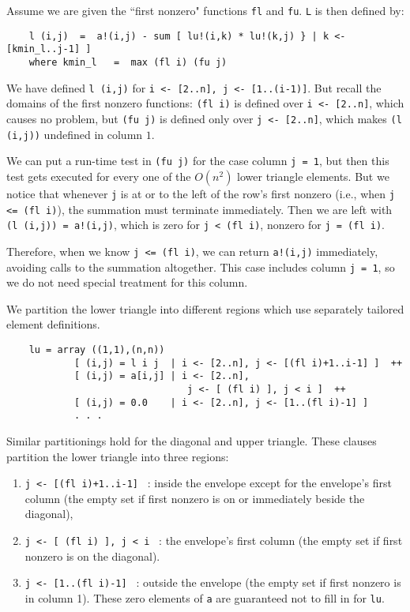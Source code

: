 Assume we are given the ``first nonzero"
functions {\tt fl} and {\tt fu}.  {\tt L} is then defined by:
\begin{verbatim}
    l (i,j)  =  a!(i,j) - sum [ lu!(i,k) * lu!(k,j) } | k <- [kmin_l..j-1] ]
    where kmin_l   =  max (fl i) (fu j)
\end{verbatim}

We have defined {\tt l (i,j)} for {\tt i <- [2..n], j <- [1..(i-1)]}.
But recall the domains of the first nonzero functions:
{\tt (fl i)} is defined over {\tt i <- [2..n]}, which causes
no problem, but {\tt (fu j)} is defined only over {\tt j <- [2..n]},
which makes {\tt (l (i,j))} undefined in column $1$.

We can put a run-time test in {\tt (fu j)} for the case column
{\tt j = 1}, but then this test gets executed for every one of
the $O(n^2)$ lower triangle elements.  But we notice that whenever
{\tt j} is at or to the left of the row's first nonzero (i.e.,
when {\tt j <= (fl i)}), the summation must terminate immediately.
Then we are left with {\tt (l (i,j)) = a!(i,j)}, which is zero for
{\tt j < (fl i)}, nonzero for {\tt j = (fl i)}.

Therefore, when we know {\tt j <= (fl i)}, we can return {\tt a!(i,j)}
immediately, avoiding calls to the summation altogether.  This case
includes column {\tt j = 1}, so we do not need special treatment
for this column.

We partition the lower triangle into different regions
which use separately tailored element definitions.
\begin{verbatim}
    lu = array ((1,1),(n,n))
            [ (i,j) = l i j  | i <- [2..n], j <- [(fl i)+1..i-1] ]  ++
            [ (i,j) = a[i,j] | i <- [2..n],
                                j <- [ (fl i) ], j < i ]  ++
            [ (i,j) = 0.0    | i <- [2..n], j <- [1..(fl i)-1] ]
            . . .
\end{verbatim}
Similar partitionings hold for the diagonal and upper triangle.
These clauses partition the lower triangle into three regions:
\begin{enumerate}
\item   {\tt  j <- [(fl i)+1..i-1] } :
        inside the envelope except for the envelope's first column
        (the empty set if first nonzero is on or immediately beside
        the diagonal),

\item    {\tt  j <- [ (fl i) ], j < i } :
        the envelope's first column
        (the empty set if first nonzero is on the diagonal).

\item    {\tt  j <- [1..(fl i)-1] } :
        outside the envelope
        (the empty set if first nonzero is in column 1).
        These zero elements of {\tt a} are guaranteed not to fill in
        for {\tt lu}.
\end{enumerate}


